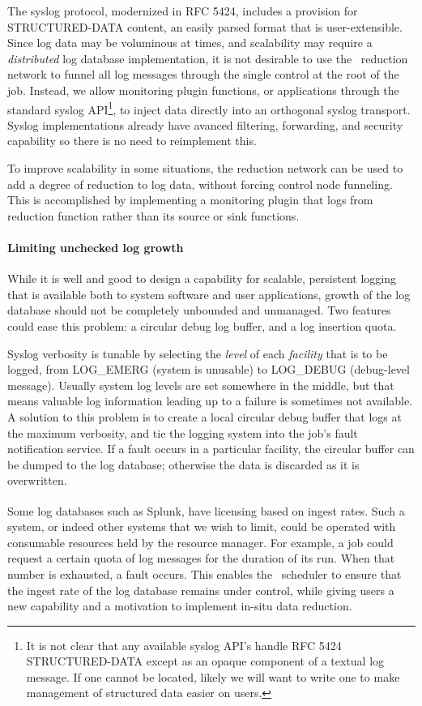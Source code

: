 The syslog protocol, modernized in RFC 5424\cite{rfc5424},
includes a provision for STRUCTURED-DATA content,
an easily parsed format that is user-extensible.
Since log data may be voluminous at times, and scalability may require
a {\em distributed} log database implementation, it is not desirable to
use the \ngrm\ reduction network to funnel all log messages through the
single control at the root of the job.  Instead, we allow monitoring
plugin functions, or applications through the standard syslog
API\footnote{It is not clear that any available syslog API's handle
RFC 5424 STRUCTURED-DATA except as an opaque component of a textual
log message.  If one cannot be located, likely we will want to write
one to make management of structured data easier on users.},
to inject data directly into an orthogonal syslog transport.
Syslog implementations already have avanced filtering, forwarding,
and security capability so there is no need to reimplement this.

To improve scalability in some situations, the reduction network can be used
to add a degree of reduction to log data, without forcing control node
funneling.  This is accomplished by implementing a monitoring plugin
that logs from reduction function rather than its source or sink functions.

\paragraph{Limiting unchecked log growth}
While it is well and good to design a capability for scalable, persistent
logging that is available both to system software and user applications,
growth of the log database should not be completely unbounded and unmanaged.
Two features could ease this problem: a circular debug log buffer, and
a log insertion quota.

Syslog verbosity is tunable by selecting the {\em level} of each
{\em facility} that is to be logged, from LOG\_EMERG (system is unusable)
to LOG\_DEBUG (debug-level message).  Usually system log levels are set
somewhere in the middle, but that means valuable log information leading
up to a failure is sometimes not available.  A solution to this problem is
to create a local circular debug buffer that logs at the maximum verbosity,
and tie the logging system into the job's fault notification service.
If a fault occurs in a particular facility, the circular buffer can be
dumped to the log database; otherwise the data is discarded as it is
overwritten.

Some log databases such as Splunk\textsuperscript{\textregistered},
have licensing based on ingest rates.  Such a system, or indeed other
systems that we wish to limit, could be operated with consumable resources
held by the resource manager.  For example, a job could request a certain
quota of log messages for the duration of its run.  When that number
is exhausted, a fault occurs.  This enables the \ngrm\ scheduler to ensure
that the ingest rate of the log database remains under control, while
giving users a new capability and a motivation to implement in-situ data
reduction.

